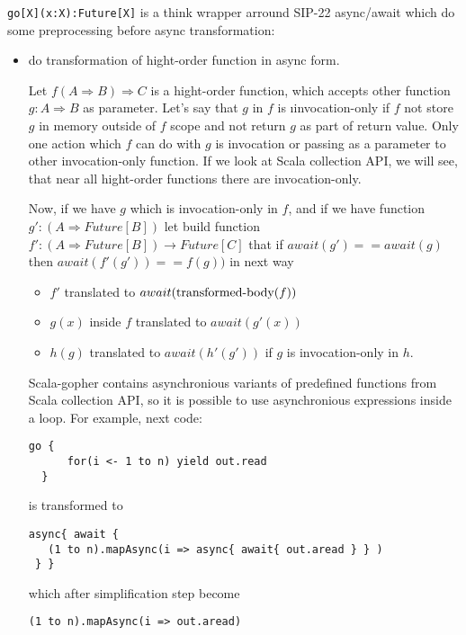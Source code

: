\documentclass[12pt]{article}
\newcommand{\To}{\Rightarrow}
\begin{document}
 \verb|go[X](x:X):Future[X]| is a think wrapper arround  SIP-22 async/await which do some preprocessing before async transformation:
\begin{itemize}
 \item do transformation of hight-order function in async form.


  Let $f(A \To B)\To C$ is a hight-order function, which accepts other function 
   $g:A \To B$ as parameter. 
  Let's say that $g$ in $f$ is {\i invocation-only } if $f$ not store $g$ in memory outside of $f$ scope and not return $g$ as part of return value. Only one action which $f$ can do with $g$ is invocation or passing as a parameter to other invocation-only function. If we look at Scala collection API, we will see, that near all hight-order functions there are invocation-only.

  Now, if we have $g$ which is invocation-only in $f$, and if we have function $g' : (A \To Future[B])$ let build function $f':(A\To Future[B])\to Future[C]$ that if $await(g')==await(g)$ then $await(f'(g'))==f(g))$ in next way
  \begin{itemize}
    \item $f'$ translated to $await(\makebox{transformed-body}(f))$
    \item $g(x)$ inside $f$ translated to $await(g'(x))$
    \item $h(g)$ translated to $await(h'(g'))$ if $g$ is invocation-only in $h$.
  \end{itemize}

  Scala-gopher contains asynchronious variants of predefined functions from Scala collection API, so it is possible to use asynchronious expressions inside a loop. For example, next code:

\begin{Verbatim}[fontsize=\small]
  go { 
      for(i <- 1 to n) yield out.read
  }
\end{Verbatim}

  is transformed to

\begin{Verbatim}[fontsize=\small]
 async{ await {
   (1 to n).mapAsync(i => async{ await{ out.aread } } )
 } }
\end{Verbatim}

  which after simplification step become

\begin{Verbatim}[fontsize=\small]
   (1 to n).mapAsync(i => out.aread)
\end{Verbatim}


\end{itemize}
\end{document}

